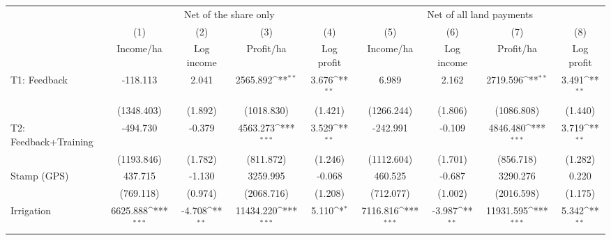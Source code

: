 {
\def\sym#1{\ifmmode^{#1}\else\(^{#1}\)\fi}
\begin{tabular}{l*{8}{c}}
\toprule
                    &\multicolumn{4}{c}{Net of the share only}                                              &\multicolumn{4}{c}{Net of all land payments}                                           \\\cmidrule(lr){2-5}\cmidrule(lr){6-9}
                    &\multicolumn{1}{c}{(1)}&\multicolumn{1}{c}{(2)}&\multicolumn{1}{c}{(3)}&\multicolumn{1}{c}{(4)}&\multicolumn{1}{c}{(5)}&\multicolumn{1}{c}{(6)}&\multicolumn{1}{c}{(7)}&\multicolumn{1}{c}{(8)}\\
                    &\multicolumn{1}{c}{Income/ha}&\multicolumn{1}{c}{Log income}&\multicolumn{1}{c}{Profit/ha}&\multicolumn{1}{c}{Log profit}&\multicolumn{1}{c}{Income/ha}&\multicolumn{1}{c}{Log income}&\multicolumn{1}{c}{Profit/ha}&\multicolumn{1}{c}{Log profit}\\
\midrule
T1: Feedback        &    -118.113         &       2.041         &    2565.892\sym{**} &       3.676\sym{**} &       6.989         &       2.162         &    2719.596\sym{**} &       3.491\sym{**} \\
                    &  (1348.403)         &     (1.892)         &  (1018.830)         &     (1.421)         &  (1266.244)         &     (1.806)         &  (1086.808)         &     (1.440)         \\
T2: Feedback+Training&    -494.730         &      -0.379         &    4563.273\sym{***}&       3.529\sym{**} &    -242.991         &      -0.109         &    4846.480\sym{***}&       3.719\sym{**} \\
                    &  (1193.846)         &     (1.782)         &   (811.872)         &     (1.246)         &  (1112.604)         &     (1.701)         &   (856.718)         &     (1.282)         \\
Stamp (GPS)         &     437.715         &      -1.130         &    3259.995         &      -0.068         &     460.525         &      -0.687         &    3290.276         &       0.220         \\
                    &   (769.118)         &     (0.974)         &  (2068.716)         &     (1.208)         &   (712.077)         &     (1.002)         &  (2016.598)         &     (1.175)         \\
Irrigation          &    6625.888\sym{***}&      -4.708\sym{**} &   11434.220\sym{***}&       5.110\sym{*}  &    7116.816\sym{***}&      -3.987\sym{**} &   11931.595\sym{***}&       5.342\sym{**} \\

\end{tabular}}
